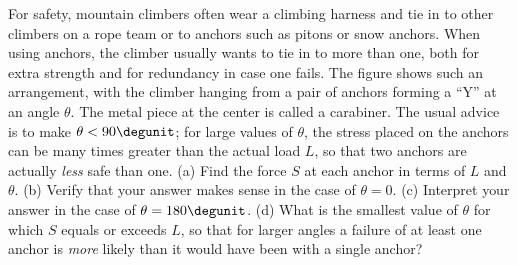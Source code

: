 For safety, mountain climbers often wear a climbing harness and tie in to other climbers on a rope
team or to anchors such as pitons or snow anchors. When using anchors, the climber usually wants to tie in
to more than one, both for extra strength and for redundancy in case one fails.
The figure shows such an arrangement, with the climber hanging from a pair of anchors forming a ``Y''
at an angle $\theta$. The metal piece at the center is called a carabiner.
The usual advice is to make $\theta<90\degunit$; for large values of $\theta$,
the stress placed on the anchors can be many times greater than the actual load $L$,
so that two anchors are actually \emph{less} safe than one.\hwendpart
(a) Find the force $S$ at each anchor in terms of $L$ and $\theta$.  \answercheck\hwendpart
(b) Verify that your answer makes sense in the case of $\theta=0$.\hwendpart
(c) Interpret your answer in the case of $\theta=180\degunit$.\hwendpart
(d) What is the smallest value of $\theta$ for which $S$ equals or exceeds $L$, so that for larger angles a failure
of at least one anchor is \emph{more} likely than it would have been with a single anchor?\answercheck\hwendpart
